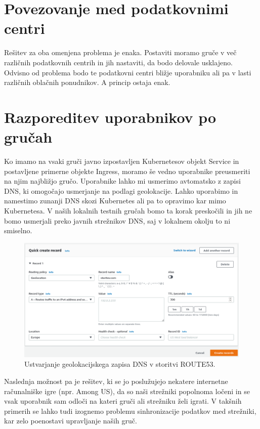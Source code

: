 \documentclass[a4paper, 12pt]{book}
\begin{document}
\section{Povezovanje med podatkovnimi centri}
Rešitev za oba omenjena problema je enaka.
Postaviti moramo gruče v več različnih podatkovnih centrih in jih nastaviti, da bodo delovale usklajeno.
Odvisno od problema bodo te podatkovni centri bližje uporabniku ali pa v lasti različnih oblačnih ponudnikov.
A princip ostaja enak.
\section{Razporeditev uporabnikov po gručah}
Ko imamo na vsaki gruči javno izpostavljen Kubernetesov objekt Service in postavljene primerne objekte Ingress, moramo še vedno uporabnike preusmeriti na njim najbližjo gručo.
Uporabnike lahko mi usmerimo avtomatsko z zapisi DNS, ki omogočajo usmerjanje na podlagi geolokacije.
Lahko uporabimo in namestimo zunanji DNS skozi Kubernetes ali pa to opravimo kar mimo Kubernetesa.
V naših lokalnih testnih gručah bomo ta korak preskočili in jih ne bomo usmerjali preko javnih strežnikov DNS, saj v lokalnem okolju to ni smiselno.
\begin{figure}[h]
\begin{center}
\includegraphics[width=1.0\textwidth]{images/geolokacijski-dns.png}
\end{center}
\caption{Ustvarjanje geolokacijskega zapisa DNS v storitvi ROUTE53.}
\label{primer-ustvarjanje-geolokacijskega-zapisa}
\end{figure}

Naslednja možnost pa je rešitev, ki se jo poslužujejo nekatere internetne računalniške igre (npr. Among US), da so naši strežniki popolnoma ločeni in se vsak uporabnik sam odloči na kateri gruči ali strežniku želi igrati.
V takšnih primerih se lahko tudi izognemo problemu sinhronizacije podatkov med strežniki, kar zelo poenostavi upravljanje naših gruč.
\end{document}
